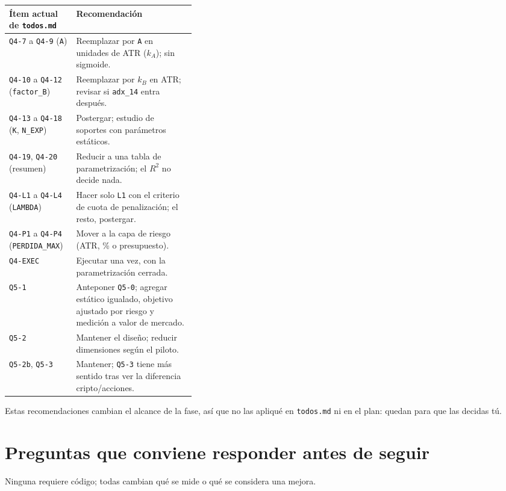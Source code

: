 \documentclass[11pt,a4paper]{article}
\newcommand{\code}[1]{\texttt{\small #1}}
\begin{document}
\begin{small}
\noindent\begin{tabularx}{\linewidth}{@{}>{\raggedright\arraybackslash}p{0.36\linewidth}X@{}}
\toprule
Ítem actual de \code{todos.md} & Recomendación \\
\midrule
\code{Q4-7} a \code{Q4-9} (\code{A}) & Reemplazar por \code{A} en unidades de ATR ($k_A$); sin sigmoide. \\
\code{Q4-10} a \code{Q4-12} (\code{factor\_B}) & Reemplazar por $k_B$ en ATR; revisar si \code{adx\_14} entra después. \\
\code{Q4-13} a \code{Q4-18} (\code{K}, \code{N\_EXP}) & Postergar; estudio de soportes con parámetros estáticos. \\
\code{Q4-19}, \code{Q4-20} (resumen) & Reducir a una tabla de parametrización; el $R^2$ no decide nada. \\
\code{Q4-L1} a \code{Q4-L4} (\code{LAMBDA}) & Hacer solo \code{L1} con el criterio de cuota de penalización; el resto, postergar. \\
\code{Q4-P1} a \code{Q4-P4} (\code{PERDIDA\_MAX}) & Mover a la capa de riesgo (ATR, \% o presupuesto). \\
\code{Q4-EXEC} & Ejecutar una vez, con la parametrización cerrada. \\
\code{Q5-1} & Anteponer \code{Q5-0}; agregar estático igualado, objetivo ajustado por riesgo y medición a valor de mercado. \\
\code{Q5-2} & Mantener el diseño; reducir dimensiones según el piloto. \\
\code{Q5-2b}, \code{Q5-3} & Mantener; \code{Q5-3} tiene más sentido tras ver la diferencia cripto/acciones. \\
\bottomrule
\end{tabularx}
\end{small}

\medskip
Estas recomendaciones cambian el alcance de la fase, así que no las apliqué en \code{todos.md} ni en el
plan: quedan para que las decidas tú.

\section{Preguntas que conviene responder antes de seguir}

Ninguna requiere código; todas cambian qué se mide o qué se considera una mejora.
\end{document}
